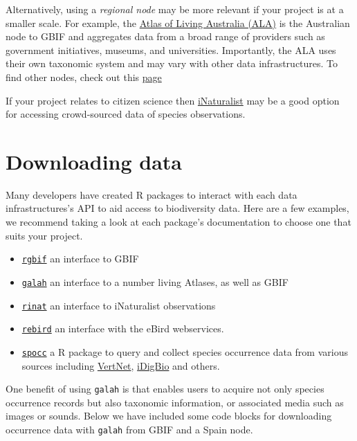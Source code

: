 \documentclass[
  letterpaper,
  DIV=11,
  numbers=noendperiod,
  oneside]{scrreprt}
\providecommand{\tightlist}{%
  \setlength{\itemsep}{0pt}\setlength{\parskip}{0pt}}\usepackage{longtable,booktabs,array}
\begin{document}
Alternatively, using a \emph{regional node} may be more relevant if your
project is at a smaller scale. For example, the
\href{www.ala.org.au}{Atlas of Living Australia (ALA)} is the Australian
node to GBIF and aggregates data from a broad range of providers such as
government initiatives, museums, and universities. Importantly, the ALA
uses their own taxonomic system and may vary with other data
infrastructures. To find other nodes, check out this
\href{https://www.gbif.org/the-gbif-network}{page}

If your project relates to citizen science then
\href{https://www.inaturalist.org/}{iNaturalist} may be a good option
for accessing crowd-sourced data of species observations.

\hypertarget{downloading-data}{%
\section{Downloading data}\label{downloading-data}}

Many developers have created R packages to interact with each data
infrastructures's API to aid access to biodiversity data. Here are a few
examples, we recommend taking a look at each package's documentation to
choose one that suits your project.

\begin{itemize}
\tightlist
\item
  \href{https://docs.ropensci.org/rgbif/}{\texttt{rgbif}} an interface
  to GBIF
\item
  \href{https://galah.ala.org.au/index.html}{\texttt{galah}} an
  interface to a number living Atlases, as well as GBIF
\item
  \href{https://docs.ropensci.org/rinat/}{\texttt{rinat}} an interface
  to iNaturalist observations
\item
  \href{https://docs.ropensci.org/rebird/}{\texttt{rebird}} an interface
  with the eBird webservices.
\item
  \href{https://docs.ropensci.org/spocc/}{\texttt{spocc}} a R package to
  query and collect species occurrence data from various sources
  including \href{https://github.com/ropensci/rvertnet}{VertNet},
  \href{http://www.idigbio.org/}{iDigBio} and others.
\end{itemize}

One benefit of using \texttt{galah} is that enables users to acquire not
only species occurrence records but also taxonomic information, or
associated media such as images or sounds. Below we have included some
code blocks for downloading occurrence data with \texttt{galah} from
GBIF and a Spain node.
\end{document}
